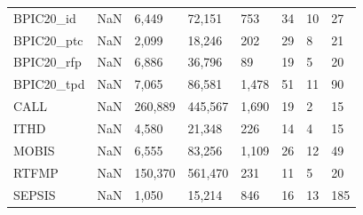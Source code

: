 \begin{tabular}{lrllllll}
 BPIC20_id &          NaN &    6,449 &    72,151 &         753 &            34 &                  10 &               27 \\
BPIC20_ptc &          NaN &    2,099 &    18,246 &         202 &            29 &                   8 &               21 \\
BPIC20_rfp &          NaN &    6,886 &    36,796 &          89 &            19 &                   5 &               20 \\
BPIC20_tpd &          NaN &    7,065 &    86,581 &       1,478 &            51 &                  11 &               90 \\
      CALL &          NaN &  260,889 &   445,567 &       1,690 &            19 &                   2 &               15 \\
      ITHD &          NaN &    4,580 &    21,348 &         226 &            14 &                   4 &               15 \\
     MOBIS &          NaN &    6,555 &    83,256 &       1,109 &            26 &                  12 &               49 \\
     RTFMP &          NaN &  150,370 &   561,470 &         231 &            11 &                   5 &               20 \\
    SEPSIS &          NaN &    1,050 &    15,214 &         846 &            16 &                  13 &              185 \\
\bottomrule
\end{tabular}
